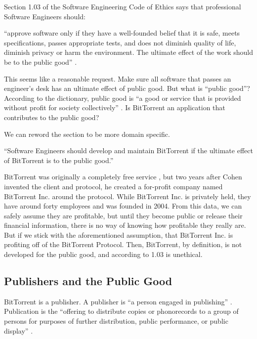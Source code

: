 \documentclass[11pt]{article}
\begin{document}
\begin{multicols}{2}
Section 1.03 of the Software Engineering Code of Ethics says that professional Software Engineers should:

{\addtolength{\leftskip}{6mm}

\noindent ``approve software only if they have a well-founded belief that it is safe, meets specifications, passes appropriate tests, and does not diminish quality of life, diminish privacy or harm the environment. The ultimate effect of the work should be to the public good'' \cite[1.03]{secode}.

}

This seems like a reasonable request. Make sure all software that passes an engineer's desk has an ultimate effect of public good. But what is ``public good''? According to the dictionary, public good is ``a good or service that is provided without profit for society collectively'' \cite{pubgooddef}. Is BitTorrent an application that contributes to the public good?

We can reword the section to be more domain specific.

{\addtolength{\leftskip}{6mm}

``Software Engineers should develop and maintain BitTorrent if the ultimate effect of BitTorrent is to the public good.''

}

BitTorrent was originally a completely free service \cite{btannounce}, but two years after Cohen invented the client and protocol, he created a for-profit company named BitTorrent Inc. around the protocol. While BitTorrent Inc. is privately held, they have around forty employees and was founded in 2004. From this data, we can safely assume they are profitable, but until they become public or release their financial information, there is no way of knowing how profitable they really are. But if we stick with the aforementioned assumption, that BitTorrent Inc. is profiting off of the BitTorrent Protocol. Then, BitTorrent, by definition, is not developed for the public good, and according to 1.03 is unethical.

\subsection{Publishers and the Public Good}

BitTorrent is a publisher. A publisher is ``a person engaged in publishing'' \cite{publisher}. Publication is the ``offering to distribute copies or phonorecords to a group of persons for purposes of further distribution, public performance, or public display'' \cite{publish}.


\end{multicols}
\end{document}
